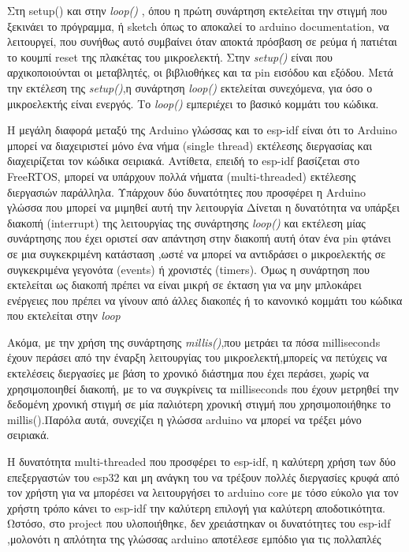 Στη \textit{}{setup()} και στην \textit{loop()} , όπου η πρώτη συνάρτηση εκτελείται την στιγμή που ξεκινάει το πρόγραμμα, ή sketch όπως το αποκαλεί το arduino documentation, να λειτουργεί, που συνήθως αυτό συμβαίνει όταν αποκτά πρόσβαση σε ρεύμα ή πατιέται το κουμπί reset της πλακέτας του μικροελεκτή. Στην \textit{setup()} είναι που αρχικοποιούνται  οι μεταβλητές, οι βιβλιοθήκες και τα pin εισόδου και εξόδου. Μετά την εκτέλεση της \textit{setup()},η συνάρτηση \textit{loop()} εκτελείται συνεχόμενα, για όσο ο μικροελεκτής είναι ενεργός. 
Το \textit{loop()} εμπεριέχει το βασικό κομμάτι του κώδικα.

Η μεγάλη διαφορά μεταξύ της Arduino γλώσσας και το esp-idf είναι ότι το Arduino μπορεί να διαχειριστεί μόνο ένα νήμα 
(single thread) εκτέλεσης διεργασίας και διαχειρίζεται τον κώδικα σειριακά. 
Αντίθετα, επειδή το esp-idf βασίζεται στο FreeRTOS, μπορεί να υπάρχουν πολλά νήματα (multi-threaded) εκτέλεσης διεργασιών παράλληλα.
Υπάρχουν δύο δυνατότητες που προσφέρει η Arduino γλώσσα που μπορεί να μιμηθεί αυτή την λειτουργία
Δίνεται η δυνατότητα να υπάρξει διακοπή (interrupt) της λειτουργίας της συνάρτησης \textit{loop()} και εκτέλεση μίας συνάρτησης που έχει οριστεί σαν απάντηση στην διακοπή αυτή όταν ένα pin φτάνει σε μια συγκεκριμένη κατάσταση 
,ωστέ να μπορεί να αντιδράσει ο μικροελεκτής σε συγκεκριμένα γεγονότα (events) ή χρονιστές (timers). 
Όμως η συνάρτηση που εκτελείται ως διακοπή πρέπει να είναι μικρή σε έκταση για να μην μπλοκάρει ενέργειες που πρέπει να γίνουν από άλλες διακοπές ή το κανονικό κομμάτι του κώδικα που εκτελείται στην \textit{loop}

Ακόμα, με την χρήση της συνάρτησης \textit{millis()},που μετράει τα πόσα milliseconds έχουν περάσει από την έναρξη λειτουργίας του μικροελεκτή,μπορείς να πετύχεις να εκτελέσεις διεργασίες με βάση το χρονικό διάστημα που έχει περάσει,
 χωρίς να χρησιμοποιηθεί διακοπή, με το να συγκρίνεις τα milliseconds που έχουν μετρηθεί την δεδομένη χρονική στιγμή σε μία παλιότερη χρονική στιγμή που χρησιμοποιήθηκε το millis().Παρόλα αυτά, συνεχίζει η γλώσσα arduino να μπορεί να τρέξει μόνο σειριακά.

Η δυνατότητα multi-threaded που προσφέρει το esp-idf, η καλύτερη χρήση των δύο επεξεργαστών του esp32 και μη ανάγκη του να τρέξουν πολλές διεργασίες κρυφά από τον χρήστη για να μπορέσει να λειτουργήσει 
το arduino core με τόσο εύκολο για τον χρήστη τρόπο κάνει το esp-idf την καλύτερη επιλογή για καλύτερη αποδοτικότητα.
Ωστόσο, στο project που υλοποιήθηκε, δεν χρειάστηκαν οι δυνατότητες του esp-idf ,μολονότι η απλότητα της γλώσσας arduino αποτέλεσε εμπόδιο για τις πολλαπλές


